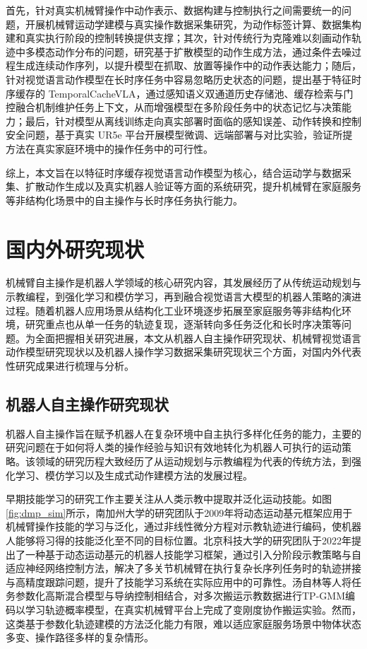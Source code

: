 首先，针对真实机械臂操作中动作表示、数据构建与控制执行之间需要统一的问题，开展机械臂运动学建模与真实操作数据采集研究，为动作标签计算、数据集构建和真实执行阶段的控制转换提供支撑；其次，针对传统行为克隆难以刻画动作轨迹中多模态动作分布的问题，研究基于扩散模型的动作生成方法，通过条件去噪过程生成连续动作序列，以提升模型在抓取、放置等操作中的动作表达能力；随后，针对视觉语言动作模型在长时序任务中容易忽略历史状态的问题，提出基于特征时序缓存的 TemporalCacheVLA，通过感知语义双通道历史存储池、缓存检索与门控融合机制维护任务上下文，从而增强模型在多阶段任务中的状态记忆与决策能力；最后，针对模型从离线训练走向真实部署时面临的感知误差、动作转换和控制安全问题，基于真实 UR5e 平台开展模型微调、远端部署与对比实验，验证所提方法在真实家庭环境中的操作任务中的可行性。

综上，本文旨在以特征时序缓存视觉语言动作模型为核心，结合运动学与数据采集、扩散动作生成以及真实机器人验证等方面的系统研究，提升机械臂在家庭服务等非结构化场景中的自主操作与长时序任务执行能力。

\section{国内外研究现状}
\label{sec:related_work}

机械臂自主操作是机器人学领域的核心研究内容，其发展经历了从传统运动规划与示教编程，到强化学习和模仿学习，再到融合视觉语言大模型的机器人策略的演进过程。随着机器人应用场景从结构化工业环境逐步拓展至家庭服务等非结构化环境，研究重点也从单一任务的轨迹复现，逐渐转向多任务泛化和长时序决策等问题。为全面把握相关研究进展，本文从机器人自主操作研究现状、机械臂视觉语言动作模型研究现状以及机器人操作学习数据采集研究现状三个方面，对国内外代表性研究成果进行梳理与分析。

\subsection{机器人自主操作研究现状}
\label{subsec:robot_autonomous_manipulation}

机器人自主操作旨在赋予机器人在复杂环境中自主执行多样化任务的能力，主要的研究问题在于如何将人类的操作经验与知识有效地转化为机器人可执行的运动策略。该领域的研究历程大致经历了从运动规划与示教编程为代表的传统方法，到强化学习、模仿学习以及生成式动作建模方法的发展过程。

早期技能学习的研究工作主要关注从人类示教中提取并泛化运动技能。如图\ref{fig:dmp_sim}所示，南加州大学的研究团队于2009年将动态运动基元框架应用于机械臂操作技能的学习与泛化，通过非线性微分方程对示教轨迹进行编码，使机器人能够将习得的技能泛化至不同的目标位置\cite{pastor2009learning}。北京科技大学的研究团队于2022年提出了一种基于动态运动基元的机器人技能学习框架，通过引入分阶段示教策略与自适应神经网络控制方法，解决了多关节机械臂在执行复杂长序列任务时的轨迹拼接与高精度跟踪问题，提升了技能学习系统在实际应用中的可靠性\cite{kong2023dynamic}。汤自林等人将任务参数化高斯混合模型与导纳控制相结合，对多次搬运示教数据进行TP-GMM编码以学习轨迹概率模型，在真实机械臂平台上完成了变刚度协作搬运实验\cite{ZDZC202111009}。然而，这类基于参数化轨迹建模的方法泛化能力有限，难以适应家庭服务场景中物体状态多变、操作路径多样的复杂情形。

